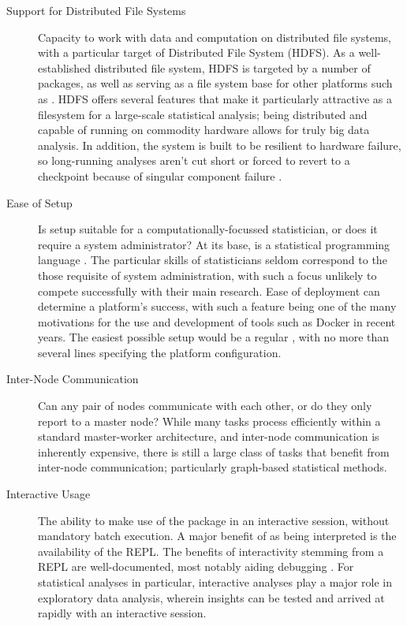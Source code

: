 \begin{description}
	\item[Support for Distributed File Systems]
		Capacity to work with data and computation on distributed file systems,
		with a particular target of 
		Distributed File System (HDFS).
		As a well-established distributed file system, HDFS is targeted by a number of \R{} packages, as well as serving as a file system base for other platforms such as  \cite{analytics:_rhadoop_wiki} \cite{deltarho:_rhipe}\cite{urbanek20}\cite{zaharia2016apache}.
		HDFS offers several features that make it particularly attractive as a filesystem for a large-scale statistical analysis; being distributed and capable of running on commodity hardware allows for truly big data analysis.
		In addition, the system is built to be resilient to hardware failure, so long-running analyses aren't cut short or forced to revert to a checkpoint because of singular component failure \cite{shvachko2010hadoop}.
	\item[Ease of Setup]
		Is setup suitable for a computationally-focussed statistician, or does
		it require a system administrator?
		At its base, \R{} is a statistical programming language \cite{rcore2020intro}.
		The particular skills of statisticians seldom correspond to the those requisite of system administration, with such a focus unlikely to compete successfully with their main research.
		Ease of deployment can determine a platform's success, with such a feature being one of the many motivations for the use and development of tools such as Docker in recent years.
		The easiest possible setup would be a regular , with no more than several lines specifying the platform configuration.
	\item[Inter-Node Communication]
		Can any pair of nodes communicate with each other, or do they only
		report to a master node?
		While many tasks process efficiently within a standard master-worker architecture, and inter-node communication is inherently expensive, there is still a large class of tasks that benefit from inter-node communication\cite{walker1996mpi}; particularly graph-based statistical methods.
	\item[Interactive Usage]
		The ability to make use of the package in an interactive \R{} session,
		without mandatory batch execution.
		A major benefit of \R{} as being interpreted is the availability of the REPL.
		The benefits of interactivity stemming from a REPL are well-documented, most notably aiding debugging \cite{mccarthy1978history}.
		For statistical analyses in particular, interactive analyses play a major role in exploratory data analysis, wherein insights can be tested and arrived at rapidly with an interactive session.

\end{description}
